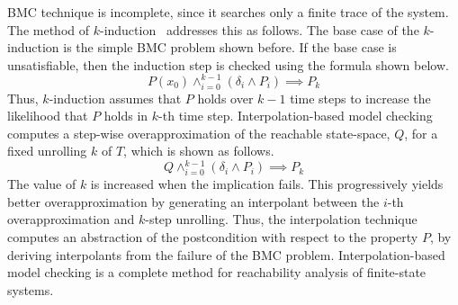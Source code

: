 %
BMC technique is incomplete, since it searches only a finite trace of the system. 
The method of $k$-induction~\cite{fmcad2000} addresses this as follows.
%
The base case of the $k$-induction is the simple BMC problem shown before. If the 
base case is unsatisfiable, then the 
induction step is checked using the formula 
shown below.  
%
\[ P(x_0) \wedge_{i=0}^{k-1} (\delta_i \wedge P_i) \implies P_k \]
%
Thus, $k$-induction assumes that $P$ holds 
over $k-1$ time steps to increase the 
likelihood that $P$ holds in $k$-th time step.
%
%
Interpolation-based model checking~\cite{cav03} 
computes a step-wise overapproximation of the reachable state-space,
$Q$, for a fixed unrolling $k$ of $T$, which is shown as
follows.
%
\[ Q \wedge_{i=0}^{k-1} (\delta_i \wedge P_i) \implies P_k \]
%
The value of $k$ is increased when the implication fails. This
progressively yields better overapproximation by 
generating an interpolant between the $i$-th 
overapproximation and $k$-step unrolling.
Thus, the interpolation technique computes an abstraction 
of the postcondition with respect to the property $P$, 
by deriving interpolants from the failure of the
BMC problem.
%
Interpolation-based model checking is a complete method 
for reachability analysis of finite-state systems. 
%

